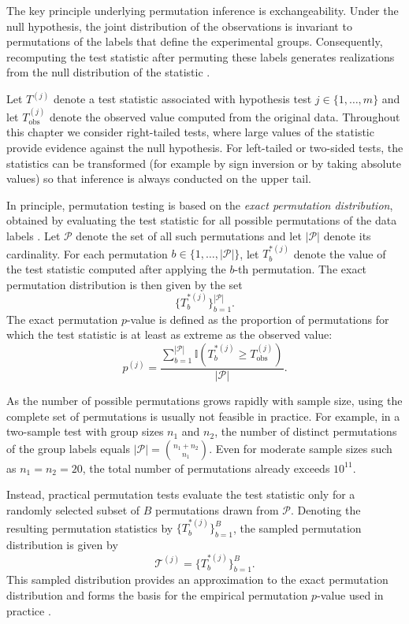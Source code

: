 The key principle underlying permutation inference is exchangeability. Under the null hypothesis, the joint distribution of the observations is invariant to permutations of the labels that define the experimental groups. Consequently, recomputing the test statistic after permuting these labels generates realizations from the null distribution of the statistic \citep{good2005permutation}.

Let $T^{(j)}$ denote a test statistic associated with hypothesis test $j \in \{1,\dots,m\}$ and let $T_{\mathrm{obs}}^{(j)}$ denote the observed value computed from the original data. 
Throughout this chapter we consider right-tailed tests, where large values of the statistic provide evidence against the null hypothesis. 
For left-tailed or two-sided tests, the statistics can be transformed (for example by sign inversion or by taking absolute values) so that inference is always conducted on the upper tail.

In principle, permutation testing is based on the \emph{exact permutation distribution}, obtained by evaluating the test statistic for all possible permutations of the data labels \citep{phipson2010permutation}. 
Let $\mathcal{P}$ denote the set of all such permutations and let $|\mathcal{P}|$ denote its cardinality. For each permutation $b \in \{1,\dots,|\mathcal{P}|\}$, let $T_b^{*(j)}$ denote the value of the test statistic computed after applying the $b$-th permutation. 
The exact permutation distribution is then given by the set
\[
\{T_b^{*(j)}\}_{b=1}^{|\mathcal{P}|}.
\]
The exact permutation $p$-value is defined as the proportion of permutations for which the test statistic is at least as extreme as the observed value:
\begin{equation}
p^{(j)} =
\frac{\sum_{b=1}^{|\mathcal{P}|}
\mathbb{I}\!\left(T_b^{*(j)} \ge T_{\mathrm{obs}}^{(j)}\right)}
{|\mathcal{P}|}.
\end{equation}

As the number of possible permutations grows rapidly with sample size, using the complete set of permutations is usually not feasible in practice. For example, in a two-sample test with group sizes $n_1$ and $n_2$, the number of distinct permutations of the group labels equals
$|\mathcal{P}| = \binom{n_1+n_2}{n_1}$.
Even for moderate sample sizes such as $n_1=n_2=20$, the total number of permutations already exceeds $10^{11}$.

Instead, practical permutation tests evaluate the test statistic only for a randomly selected subset of $B$ permutations drawn from $\mathcal{P}$. 
Denoting the resulting permutation statistics by $\{T_b^{*(j)}\}_{b=1}^{B}$, the sampled permutation distribution is given by
\begin{equation}
\mathcal{T}^{(j)} = \{T_b^{*(j)}\}_{b=1}^{B}.
\end{equation}
This sampled distribution provides an approximation to the exact permutation distribution and forms the basis for the empirical permutation $p$-value used in practice \citep{phipson2010permutation}.

